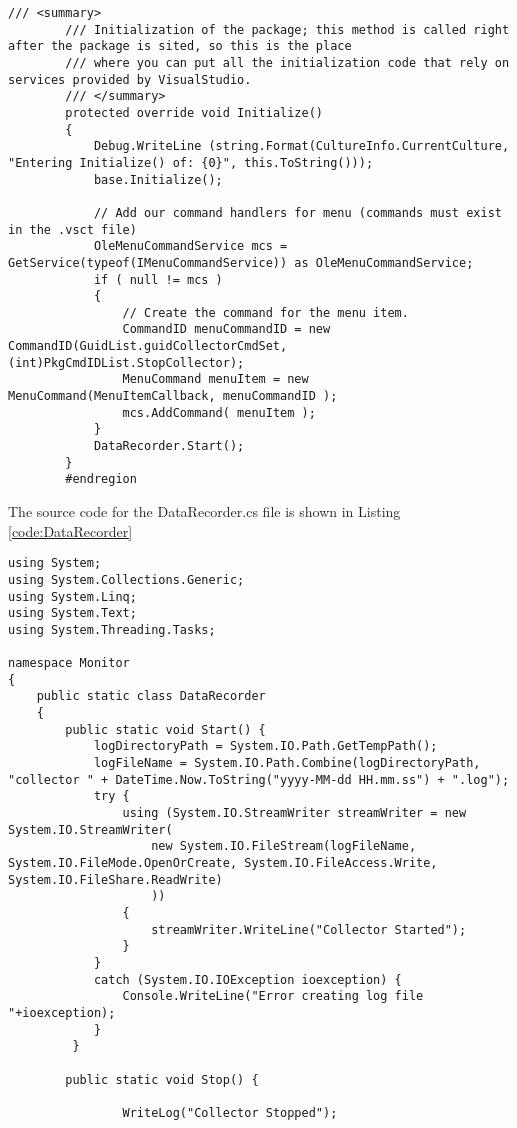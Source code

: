 \begin{enumerate}
\begin{lstlisting}[caption=Call to DataRecorder.Start(),label=code:StartCall]
        /// <summary>
        /// Initialization of the package; this method is called right after the package is sited, so this is the place
        /// where you can put all the initialization code that rely on services provided by VisualStudio.
        /// </summary>
        protected override void Initialize()
        {
            Debug.WriteLine (string.Format(CultureInfo.CurrentCulture, "Entering Initialize() of: {0}", this.ToString()));
            base.Initialize();

            // Add our command handlers for menu (commands must exist in the .vsct file)
            OleMenuCommandService mcs = GetService(typeof(IMenuCommandService)) as OleMenuCommandService;
            if ( null != mcs )
            {
                // Create the command for the menu item.
                CommandID menuCommandID = new CommandID(GuidList.guidCollectorCmdSet, (int)PkgCmdIDList.StopCollector);
                MenuCommand menuItem = new MenuCommand(MenuItemCallback, menuCommandID );
                mcs.AddCommand( menuItem );
            }
            DataRecorder.Start();
        }
        #endregion
\end{lstlisting}

The source code for the DataRecorder.cs file is shown in Listing \ref{code:DataRecorder}
\begin{lstlisting}[caption=Data Recorder Class,  label=code:DataRecorder]
using System;
using System.Collections.Generic;
using System.Linq;
using System.Text;
using System.Threading.Tasks;

namespace Monitor
{
    public static class DataRecorder
    {
        public static void Start() {
            logDirectoryPath = System.IO.Path.GetTempPath();
            logFileName = System.IO.Path.Combine(logDirectoryPath, "collector " + DateTime.Now.ToString("yyyy-MM-dd HH.mm.ss") + ".log");
            try {
                using (System.IO.StreamWriter streamWriter = new System.IO.StreamWriter(
                    new System.IO.FileStream(logFileName, System.IO.FileMode.OpenOrCreate, System.IO.FileAccess.Write, System.IO.FileShare.ReadWrite)
                    ))
                {
                    streamWriter.WriteLine("Collector Started");
                }
            } 
            catch (System.IO.IOException ioexception) {
                Console.WriteLine("Error creating log file "+ioexception);
            }
         }

        public static void Stop() {

                WriteLog("Collector Stopped");
            

\end{lstlisting}
\end{enumerate}
